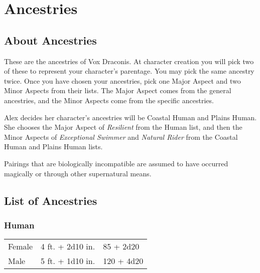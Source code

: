 \chapter{Ancestries}

\begin{multicols}{2}

\section{About Ancestries}

These are the ancestries of Vox Draconis. At character creation you will 
pick two of these to represent your character's parentage. You may pick 
the same ancestry twice. Once you have chosen your ancestries, pick one 
Major Aspect and two Minor Aspects from their lists. The Major Aspect 
comes from the general ancestries, and the Minor Aspects come from the 
specific ancestries.

\begin{displayquote}
Alex decides her character's ancestries will be Coastal Human and Plains 
Human. She chooses the Major Aspect of \textit{Resilient} from the Human
list, and then the Minor Aspects of \textit{Exceptional Swimmer} and 
\textit{Natural Rider} from the Coastal Human and Plains Human lists.
\end{displayquote}

Pairings that are biologically incompatible are assumed to have occurred 
magically or through other supernatural means.

\section{List of Ancestries}

\subsection{Human}

\begin{center}
\begin{xtabular}{|l|l|l|}
Female & 4 ft. + 2d10 in. & 85 + 2d20 \\
Male & 5 ft. + 1d10 in. & 120 + 4d20 \\
\hline
\end{xtabular}
\end{center}


\end{multicols}
